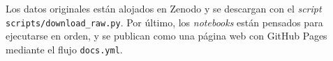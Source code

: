 Los datos originales están alojados en Zenodo y se descargan con el \textit{script} \texttt{scripts/\allowbreak download\_\allowbreak raw.py}. Por último, los \textit{notebooks} están pensados para ejecutarse en orden, y se publican como una página web con GitHub Pages mediante el flujo \texttt{docs.yml}.
\\

